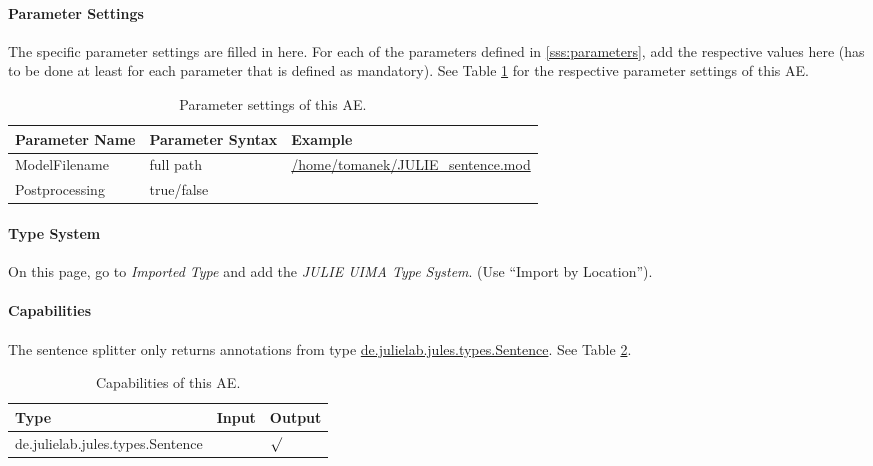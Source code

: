 \documentclass[11pt,a4paper,halfparskip]{scrartcl}
\begin{document}
\paragraph{Parameter Settings}
\label{sss:param_settings}

The specific parameter settings are filled in here. For each of the
parameters defined in \ref{sss:parameters}, add the respective values
here (has to be done at least for each parameter that is defined as
mandatory). See Table \ref{tab:param_settings} for the respective
parameter settings of this AE.

\begin{table}[h!]
  \centering
  \begin{tabular}{|p{4cm}|p{4cm}|p{7cm}|}
    \hline
    Parameter Name & Parameter Syntax & Example \\
    \hline\hline
    ModelFilename & full path & \url{/home/tomanek/JULIE_sentence.mod}\\
    \hline
    Postprocessing & true/false &\\
  \hline
  \end{tabular}
  \caption{Parameter settings of this AE.}
  \label{tab:param_settings}
\end{table}

\paragraph{Type System}
\label{sss:type_system}
On this page, go to \emph{Imported Type} and add the \emph{JULIE UIMA
  Type System}. (Use ``Import by Location'').


\paragraph{Capabilities}
\label{sss:capabilities}
The sentence splitter only returns annotations from type \url{de.julielab.jules.types.Sentence}. See Table \ref{tab:capabilities}.
\begin{table}[h!]
  \centering
  \begin{tabular}{|p{5cm}|p{2cm}|p{2cm}|}
    \hline
    Type & Input & Output \\
    \hline\hline
     de.julielab.jules.types.Sentence & &  $\surd$  \\
      \hline
  \end{tabular}
  \caption{Capabilities of this AE.}
  \label{tab:capabilities}
\end{table} 
\end{document}
